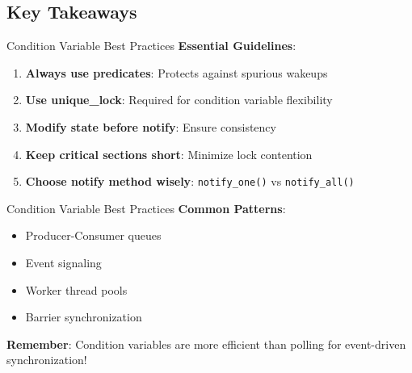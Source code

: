 \subsection{Key Takeaways}
\begin{frame}{Condition Variable Best Practices}
	\textbf{Essential Guidelines}:
	\begin{enumerate}
		\item \textbf{Always use predicates}: Protects against spurious wakeups
		\item \textbf{Use unique\_lock}: Required for condition variable flexibility
		\item \textbf{Modify state before notify}: Ensure consistency
		\item \textbf{Keep critical sections short}: Minimize lock contention
		\item \textbf{Choose notify method wisely}: \texttt{notify\_one()} vs \texttt{notify\_all()}
	\end{enumerate}
\end{frame}

\begin{frame}{Condition Variable Best Practices}
	\textbf{Common Patterns}:
	\begin{itemize}
		\item Producer-Consumer queues
		\item Event signaling
		\item Worker thread pools
		\item Barrier synchronization
	\end{itemize}

	\vspace{1em}
	\textbf{Remember}: Condition variables are more efficient than polling for event-driven synchronization!
\end{frame}
